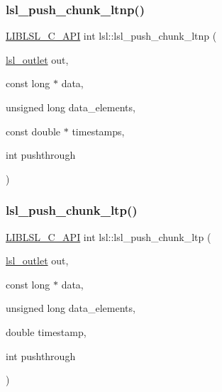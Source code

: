 \subsubsection{\texorpdfstring{lsl\+\_\+push\+\_\+chunk\+\_\+ltnp()}{lsl\_push\_chunk\_ltnp()}}
{\footnotesize\ttfamily \hyperlink{lsl__cpp_8h_aafd0ef1813e8be84a1420c4f1df64615}{L\+I\+B\+L\+S\+L\+\_\+\+C\+\_\+\+A\+PI} int lsl\+::lsl\+\_\+push\+\_\+chunk\+\_\+ltnp (\begin{DoxyParamCaption}\item[{\hyperlink{namespacelsl_abcf512b0f66dacf86c10b165995fd50b}{lsl\+\_\+outlet}}]{out,  }\item[{const long $\ast$}]{data,  }\item[{unsigned long}]{data\+\_\+elements,  }\item[{const double $\ast$}]{timestamps,  }\item[{int}]{pushthrough }\end{DoxyParamCaption})}

\mbox{\label{namespacelsl_a1a6be2ac3bc8a1df1f4c08d0b3a79445}} 
\subsubsection{\texorpdfstring{lsl\+\_\+push\+\_\+chunk\+\_\+ltp()}{lsl\_push\_chunk\_ltp()}}
{\footnotesize\ttfamily \hyperlink{lsl__cpp_8h_aafd0ef1813e8be84a1420c4f1df64615}{L\+I\+B\+L\+S\+L\+\_\+\+C\+\_\+\+A\+PI} int lsl\+::lsl\+\_\+push\+\_\+chunk\+\_\+ltp (\begin{DoxyParamCaption}\item[{\hyperlink{namespacelsl_abcf512b0f66dacf86c10b165995fd50b}{lsl\+\_\+outlet}}]{out,  }\item[{const long $\ast$}]{data,  }\item[{unsigned long}]{data\+\_\+elements,  }\item[{double}]{timestamp,  }\item[{int}]{pushthrough }\end{DoxyParamCaption})}

\mbox{\label{namespacelsl_ac2e4e87bd196fe5469934eaf87ecdaa2}} 
